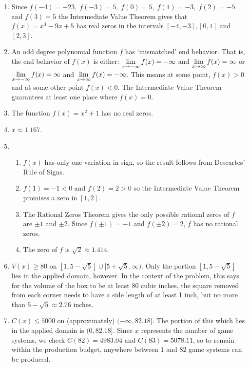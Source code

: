 \begin{enumerate}
\setcounter{enumi}{\value{HW}}

\item Since $f(-4)=-23,\; f(-3)=5,\; f(0)=5,\; f(1)=-3,\; f(2)=-5\;$ and $f(3)=5$ the Intermediate Value Theorem gives that $f(x) = x^{3} - 9x + 5$ has real zeros in the intervals $[-4, -3], [0, 1]$ and $[2, 3]$. 


\item  An odd degree polynomial  function $f$ has `mismatched' end behavior.  That is, the end behavior of $f(x)$ is either:  $\displaystyle{\lim_{x \rightarrow -\infty} f(x) = -\infty}$  and  $\displaystyle{\lim_{x \rightarrow \infty} f(x) = \infty}$  or $\displaystyle{\lim_{x \rightarrow -\infty} f(x) = \infty}$  and  $\displaystyle{\lim_{x \rightarrow \infty} f(x) = -\infty}$.  This means at some point, $f(x) > 0$ and at some other point $f(x) < 0$.  The Intermediate Value Theorem guarantees at least one place where $f(x) = 0$.

\item  The function $f(x) = x^2+1$ has no real zeros.

\item  $x \approx 1.167$.

\item  \begin{enumerate} 

\item  $f(x)$ has only one variation in sign, so the result follows from Descartes' Rule of Signs.

 \item $f(1) = -1<0$ and $f(2) = 2>0$ so the Intermediate Value Theorem promises a zero in $[1,2]$.

\item The Rational Zeros Theorem gives the only possible rational zeros of $f$ are $\pm 1$ and $\pm 2$.  Since $f(\pm 1) = -1$ and $f(\pm 2) = 2$, $f$ has no rational zeros.  

\item  The zero of $f$ is $\sqrt{2} \approx 1.414$. 

\end{enumerate}

\item  $V(x) \geq 80$ on $[1,5-\sqrt{5}] \cup [5+\sqrt{5}, \infty)$.  Only the portion $[1,5-\sqrt{5}]$ lies in the applied domain, however.   In the context of the problem, this says for the volume of the box to be at least 80 cubic inches, the square removed from each corner needs to have a side length of at least 1 inch, but no more than $5-\sqrt{5} \approx 2.76$ inches.

\item $C(x) \leq 5000$ on (approximately) $(-\infty, 82.18]$.  The portion of this which lies in the applied domain is $(0,82.18]$.  Since $x$ represents the number of game systems, we check $C(82) = 4983.04$ and $C(83) = 5078.11$, so to remain within the production budget, anywhere between $1$ and $82$ game systems can be produced.


\setcounter{HW}{\value{enumi}}
\end{enumerate}
